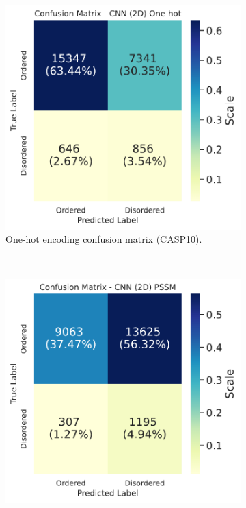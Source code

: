 \documentclass{l4proj}
\begin{document}
\begin{figure}[!htb] 
    \centering
    \begin{subfigure}[b]{0.48\textwidth}
        \includegraphics[width=\textwidth]{images/confmats/CASP10CNN2D1hot-cf.pdf}
        \caption{One-hot encoding confusion matrix (CASP10).}
        \label{fig:caspcf2d1hot}
    \end{subfigure}
    ~
    \begin{subfigure}[b]{0.48\textwidth}
        \includegraphics[width=\textwidth]{images/confmats/CASP10CNN2Dpssm-cf.pdf}

\end{subfigure}
\end{figure}
\end{document}

